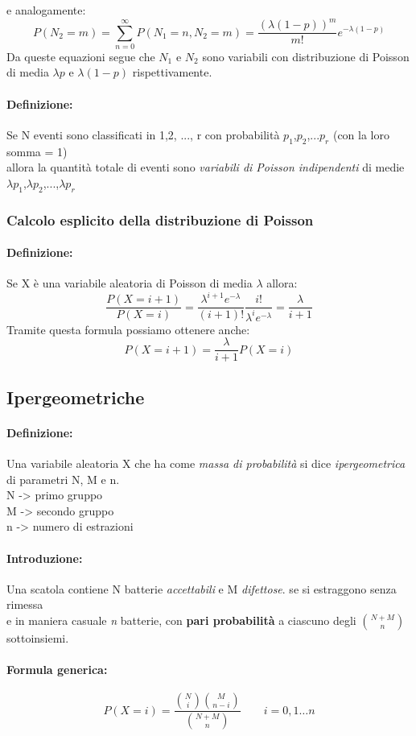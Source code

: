 \documentclass[]{article}
\newcommand{\definizione}{\paragraph{Definizione:}}
\newcommand{\formula}{\paragraph{Formula generica:}}
\begin{document}
    e analogamente:
    \[ P(N_2 = m) = \sum_{n = 0}^{\infty} P(N_1 =n, N_2 = m) = \frac{(\lambda (1-p))^m}{m!} e^{-\lambda (1-p)} \]
    Da queste equazioni segue che $N_1$ e $N_2$ sono variabili con distribuzione di Poisson di media $\lambda p$ e $\lambda (1-p)$ rispettivamente.

    \definizione Se N eventi sono classificati in 1,2, ..., r con probabilità $p_1$,$p_2$,...$p_r$ (con la loro somma = 1) \\
    allora la quantità totale di eventi sono \textit{variabili di Poisson indipendenti} di medie $\lambda p_1$,$\lambda p_2$,...,$\lambda p_r$
    \subsubsection{Calcolo esplicito della distribuzione di Poisson}
    \definizione Se X è una variabile aleatoria di Poisson di media $\lambda$ allora:
    \[ \frac{P(X = i + 1)}{P(X = i)} = \frac{\lambda^{i+1} e^{-\lambda}}{(i+1)!} \frac{i!}{\lambda^i e^{-\lambda}} = \frac{\lambda}{i + 1} \]
    Tramite questa formula possiamo ottenere anche:
    \[ P(X = i + 1) = \frac{\lambda}{i + 1} P(X = i) \]
    \newpage
    \subsection{Ipergeometriche}
    \definizione Una variabile aleatoria X che ha come \textit{massa di probabilità} si dice \textit{ipergeometrica} di parametri N, M e n. \\
    N -> primo gruppo \\
    M -> secondo gruppo \\
    n -> numero di estrazioni
    \paragraph{Introduzione:}
    Una scatola contiene N batterie \textit{accettabili} e M \textit{difettose}. se si estraggono senza rimessa \\
    e in maniera casuale \textit{n} batterie, con \textbf{pari probabilità} a ciascuno degli $\binom{N + M}{n}$ sottoinsiemi.
    \formula
    \[  P(X = i) = \frac{\binom{N}{i} \binom{M}{n - i}}{\binom{N + M}{n}} \quad \quad i = 0,1 \ldots n \]
\end{document}

